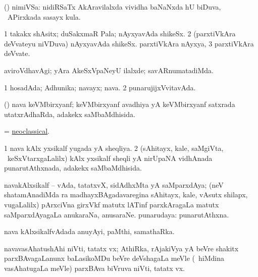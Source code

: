 \bentry
{}
\gl{\nA}
\bmng
(\savi) nimiVSa: nidiRSaTx AkAravilalxda vividha baNaNxda hU biDuva, \da\ APirxkada sasayx kula. 
\emng
\eentry

\bentry
{}
\gl{\nA}
\bmng
\bnum
\num{1} takakx shAsitx; duSakxmaR Pala; nAyxyavAda shikeSx. 
\num{2} (parxtiVkAra deVvateyu niVDuva) nAyxyavAda shikeSx. parxtiVkAra nAyxya, 
\num{3} parxtiVkAra deVvate. 
\enum
\emng
\eentry

\bentry
{}
\gl{\kirxvi}
\expl{\Latin}
\bmng
aviroVdhavAgi; yAra AkeSxVpaNeyU ilalxde; savARnumatadiMda. 
\emng
\eentry

\bentry
{}
\gl{\sapUpa}
\bmng
\bnum
\num{1} hosadAda; Adhunika; navayx; nava. 
\num{2} punarujijxVvitavAda. 
\enum
\emng
\eentry

\bentry
{}
\gl{\gu}
\bmng
(\BUvi) nava keVMbirxyanf; keVMbirxyanf avadhiya yA keVMbirxyanf satxrada utatxrAdhaRda, adakekx saMbaMdhisida. 
\emng
\eentry

\bentry
{}
\gl{\gu}
\bmng
= \hyperlink{neoclassical}{neoclassical}. 
\emng
\eentry

\bentry
{}
\gl{\gu}
\bmng
\bnum
\num{1} nava kAlx yxsikalf yugada yA sheqliya. 
\num{2} (sAhitayx, kale, saMgiVta, \mo\ keSxVtarxgaLalilx) kAlx yxsikalf sheqli yA nirUpaNA vidhAnada punarutAthxnada, adakekx saMbaMdhisida. 
\enum
\emng
\eentry

\bentry
{}
\gl{\nA}
\bmng
navakAlxsikalf -- vAda, tatatxvX, sidAdhxMta yA saMparxdAya; (neV shatamAnadiMda ra madhayxBAgadavaregina sAhitayx, kale, vAsutx shilapx, \mo vugaLalilx) pArxciVna girxVkf matutx lATinf parxkAragaLa matutx saMparxdAyagaLa 
\banum
{} anukaraNa, anusaraNe. 
 punarudaya: punarutAthxna. 
\eanum
\emng
\eentry

\bentry
{}
\gl{\nA}
\bmng
nava kAlxsikalfvAdada anuyAyi, paMthi, samathaRka. 
\emng
\eentry

\bentry
{}
\gl{\nA}
\bmng
navavasAhatushAhi niVti, tatatx vx; AthiRka, rAjakiVya yA beVre shakitx parxBAvagaLanunx baLasikoMDu beVre deVshagaLa meVle (\kanmu\ hiMdina vasAhatugaLa meVle) parxBAva biVruva niVti, tatatx vx. 
\emng
\eentry

